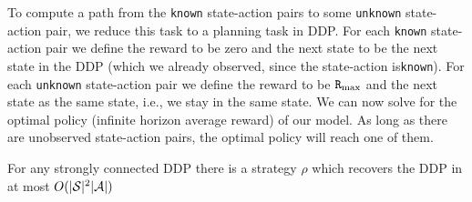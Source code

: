 To compute a path from the \texttt{known} state-action pairs to some \texttt{unknown}
state-action pair, we reduce this task to a planning task in DDP.
%
For each \texttt{known} state-action pair  we define the reward to be zero and the
next state to be the next state in the DDP (which we already observed, since the state-action is\texttt{known}). 
For each \texttt{unknown}
state-action pair we define the reward to be ${\tt R}_{\max }$ and the next state
as the same state, i.e., we stay in the same state. We can now solve for the optimal
policy (infinite horizon average reward) of our model. As long as
there are unobserved state-action pairs, the optimal policy will
reach one of them.

\begin{theorem}
For any strongly connected DDP there is a strategy $\rho$ which
recovers the DDP in at most $O(|\mathcal{S}|^2 |\mathcal{A}|)$
\end{theorem}

